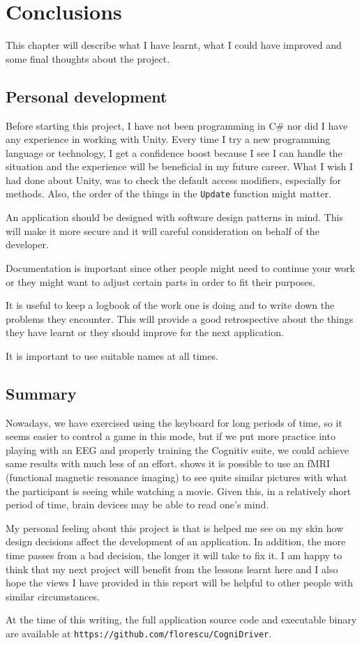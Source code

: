 \chapter{Conclusions}
\label{cha:conclusions}
This chapter will describe what I have learnt, what I could have improved and some final thoughts about the project.

\section{Personal development}
Before starting this project, I have not been programming in C\# nor did I have any experience in working with Unity. Every time I try a new programming language or technology, I get a confidence boost because I see I can handle the situation and the experience will be beneficial in my future career. What I wish I had done about Unity, was to check the default access modifiers, especially for methods. Also, the order of the things in the \texttt{Update} function might matter. 

An application should be designed with software design patterns in mind. This will make it more secure and it will careful consideration on behalf of the developer. 

Documentation is important since other people might need to continue your work or they might want to adjust certain parts in order to fit their purposes.

It is useful to keep a logbook of the work one is doing and to write down the problems they encounter. This will provide a good retrospective about the things they have learnt or they should improve for the next application.

It is important to use suitable names at all times.

\section{Summary}

Nowadays, we have exercised using the keyboard for long periods of time, so it seems easier to control a game in this mode, but if we put more practice into playing with an EEG and properly training the Cognitiv suite, we could achieve same results with much less of an effort. \cite{moviebrain} shows it is possible to use an fMRI (functional magnetic resonance imaging) to see quite similar pictures with what the participant is seeing while watching a movie. Given this, in a relatively short period of time, brain devices may be able to read one's mind.

My personal feeling about this project is that is helped me see on my skin how design decisions affect the development of an application. In addition, the more time passes from a bad decision, the longer it will take to fix it. I am happy to think that my next project will benefit from the lessons learnt here and I also hope the views I have provided in this report will be helpful to other people with similar circumstances.

At the time of this writing, the full application source code and executable binary are available at \texttt{https://github.com/florescu/CogniDriver}.

\nocite{jmurray}